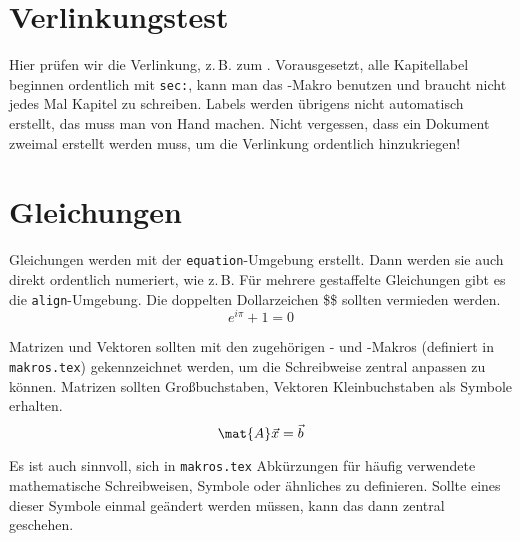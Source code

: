 \section{Verlinkungstest}
\label{sec:Verlinkungstest}

Hier prüfen wir die Verlinkung, z.\,B. zum .
Vorausgesetzt, alle Kapitellabel beginnen ordentlich mit \texttt{sec:}, kann man das -Makro benutzen und braucht nicht jedes Mal Kapitel zu schreiben.
Labels werden übrigens nicht automatisch erstellt, das muss man von Hand machen.
Nicht vergessen, dass ein Dokument zweimal erstellt werden muss, um die Verlinkung
ordentlich hinzukriegen!

\section{Gleichungen}
Gleichungen werden mit der \texttt{equation}-Umgebung erstellt.
Dann werden sie auch direkt ordentlich numeriert, wie z.\,B. 
Für mehrere gestaffelte Gleichungen gibt es die \texttt{align}-Umgebung.
Die doppelten Dollarzeichen \$\$ sollten vermieden werden.
\begin{equation}
	e^{i \pi} + 1 = 0
	\label{eq:Fundamentalgleichung}
\end{equation}

Matrizen und Vektoren sollten mit den zugehörigen - und -Makros (definiert in \texttt{makros.tex}) gekennzeichnet werden, um die Schreibweise zentral anpassen zu können.
Matrizen sollten Großbuchstaben, Vektoren Kleinbuchstaben als Symbole erhalten.
\begin{equation}
	\mat{A} \vec{x} = \vec{b}
	\label{eq:LGS}
\end{equation}

Es ist auch sinnvoll, sich in \texttt{makros.tex} Abkürzungen für häufig verwendete mathematische Schreibweisen, Symbole oder ähnliches zu definieren.
Sollte eines dieser Symbole einmal geändert werden müssen, kann das dann zentral geschehen.


